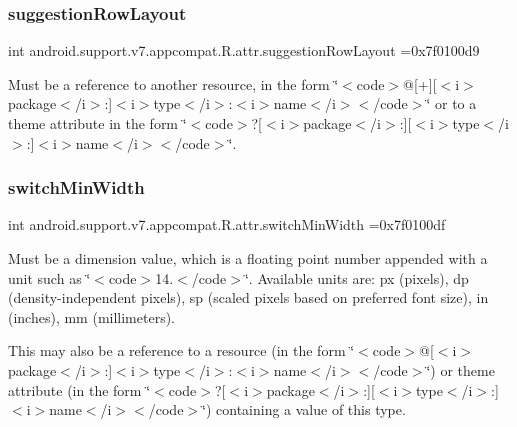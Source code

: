\subsubsection{\texorpdfstring{suggestion\+Row\+Layout}{suggestionRowLayout}}
{\footnotesize\ttfamily int android.\+support.\+v7.\+appcompat.\+R.\+attr.\+suggestion\+Row\+Layout =0x7f0100d9\hspace{0.3cm}{\ttfamily [static]}}

Must be a reference to another resource, in the form \char`\"{}$<$code$>$@\mbox{[}+\mbox{]}\mbox{[}$<$i$>$package$<$/i$>$\+:\mbox{]}$<$i$>$type$<$/i$>$\+:$<$i$>$name$<$/i$>$$<$/code$>$\char`\"{} or to a theme attribute in the form \char`\"{}$<$code$>$?\mbox{[}$<$i$>$package$<$/i$>$\+:\mbox{]}\mbox{[}$<$i$>$type$<$/i$>$\+:\mbox{]}$<$i$>$name$<$/i$>$$<$/code$>$\char`\"{}. \mbox{\label{classandroid_1_1support_1_1v7_1_1appcompat_1_1R_1_1attr_aafe6db8b889a67906f7cccf72cb3bca4}} 
\subsubsection{\texorpdfstring{switch\+Min\+Width}{switchMinWidth}}
{\footnotesize\ttfamily int android.\+support.\+v7.\+appcompat.\+R.\+attr.\+switch\+Min\+Width =0x7f0100df\hspace{0.3cm}{\ttfamily [static]}}

Must be a dimension value, which is a floating point number appended with a unit such as \char`\"{}$<$code$>$14.\+5sp$<$/code$>$\char`\"{}. Available units are\+: px (pixels), dp (density-\/independent pixels), sp (scaled pixels based on preferred font size), in (inches), mm (millimeters). 

This may also be a reference to a resource (in the form \char`\"{}$<$code$>$@\mbox{[}$<$i$>$package$<$/i$>$\+:\mbox{]}$<$i$>$type$<$/i$>$\+:$<$i$>$name$<$/i$>$$<$/code$>$\char`\"{}) or theme attribute (in the form \char`\"{}$<$code$>$?\mbox{[}$<$i$>$package$<$/i$>$\+:\mbox{]}\mbox{[}$<$i$>$type$<$/i$>$\+:\mbox{]}$<$i$>$name$<$/i$>$$<$/code$>$\char`\"{}) containing a value of this type. \mbox{\label{classandroid_1_1support_1_1v7_1_1appcompat_1_1R_1_1attr_add600be9acdf3c047a7d45235678c4fb}} 
